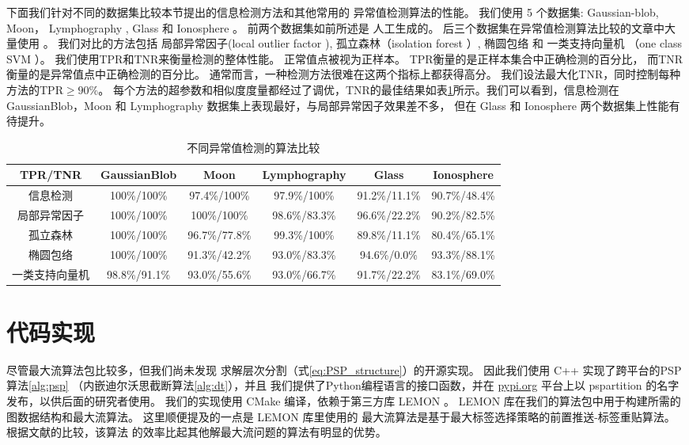 下面我们针对不同的数据集比较本节提出的信息检测方法和其他常用的
异常值检测算法的性能。
我们使用 5 个数据集: Gaussian-blob, Moon， Lymphography
\cite{lazarevic2005feature}, Glass 和 Ionosphere \cite{keller2012hics}。 
前两个数据集如前所述是
人工生成的。
后三个数据集在异常值检测算法比较的文章中大量使用
\cite{campos2016evaluation}。
我们对比的方法包括
局部异常因子(local outlier factor \citep{Breunig}), 孤立森林（isolation forest \citep{if}）, 
椭圆包络  和
一类支持向量机 （one class SVM \citep{svm}）。 
我们使用TPR和TNR来衡量检测的整体性能。
正常值点被视为正样本。
TPR衡量的是正样本集合中正确检测的百分比，
而TNR衡量的是异常值点中正确检测的百分比。
通常而言，一种检测方法很难在这两个指标上都获得高分。
我们设法最大化TNR，同时控制每种方法的TPR$\geq 90\%$。
每个方法的超参数和相似度度量都经过了调优，TNR的最佳结果如表\ref{tab:odm}所示。我们可以看到，信息检测在 GaussianBlob，Moon 和
Lymphography 数据集上表现最好，与局部异常因子效果差不多，
但在 Glass 和  Ionosphere 两个数据集上性能有待提升。
\begin{table}
  \begin{adjustbox}{width=\columnwidth,center}
\begin{tabular}{cccccc}
  \hline
         TPR/TNR        &  GaussianBlob   &      Moon       &  Lymphography  &     Glass     &  Ionosphere   \\
  \hline
      信息检测    & 100\%/100\% & 97.4\%/100\%  & 97.9\%/100\% & 91.2\%/11.1\% & 90.7\%/48.4\% \\
      局部异常因子 & 100\%/100\% & 100\%/100\% & 98.6\%/83.3\%  & 96.6\%/22.2\% & 90.2\%/82.5\% \\
   孤立森林   & 100\%/100\% &  96.7\%/77.8\%  & 99.3\%/100\% & 89.8\%/11.1\% & 80.4\%/65.1\% \\
    椭圆包络   & 100\%/100\% &  91.3\%/42.2\%  & 93.0\%/83.3\%  & 94.6\%/0.0\%  & 93.3\%/88.1\% \\
     一类支持向量机     &  98.8\%/91.1\%  &  93.0\%/55.6\%  & 93.0\%/66.7\%  & 91.7\%/22.2\% & 83.1\%/69.0\% \\
  \hline
  \end{tabular}
\end{adjustbox}
\caption{不同异常值检测的算法比较}\label{tab:odm}
\end{table}

\section{代码实现}
尽管最大流算法包比较多，但我们尚未发现
求解层次分割（式\eqref{eq:PSP_structure}）的开源实现。
因此我们使用 C++ 实现了跨平台的PSP算法\ref{alg:psp}
（内嵌迪尔沃思截断算法\ref{alg:dt}），并且
我们提供了Python编程语言的接口函数，并在 \url{pypi.org}
平台上以 pspartition
的名字发布，以供后面的研究者使用。
我们的实现使用 CMake 编译，依赖于第三方库 LEMON \cite{dezsHo2011lemon}。 
LEMON 库在我们的算法包中用于构建所需的图数据结构和最大流算法。
这里顺便提及的一点是 LEMON 库里使用的
最大流算法是基于最大标签选择策略的前置推送-标签重贴算法。
根据文献\citet{ahuja1997computational}的比较，该算法
的效率比起其他解最大流问题的算法有明显的优势。


